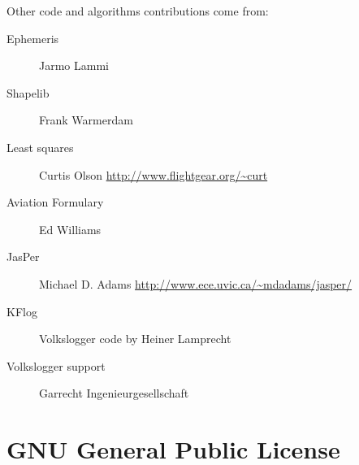 \documentclass[a4paper,12pt]{refrep}
\begin{document}
Other code and algorithms contributions come from:
\begin{description}
\item[Ephemeris] Jarmo Lammi
\item[Shapelib] Frank Warmerdam
\item[Least squares] Curtis Olson \url{http://www.flightgear.org/~curt}
\item[Aviation Formulary] Ed Williams
\item[JasPer] Michael D. Adams \url{http://www.ece.uvic.ca/~mdadams/jasper/}
\item[KFlog] Volkslogger code by Heiner Lamprecht
\item[Volkslogger support] Garrecht Ingenieurgesellschaft
\end{description}


\appendix

\chapter{GNU General Public License}\label{cha:gnu-general-public}

\end{document}
